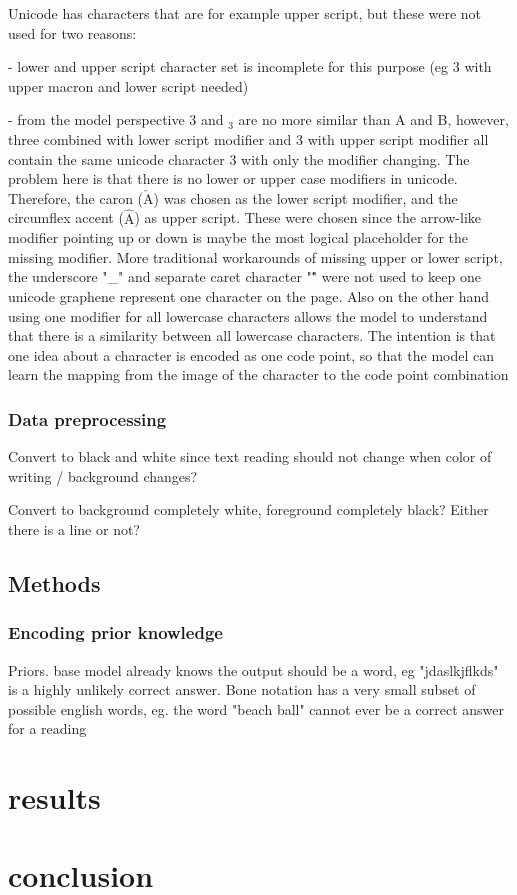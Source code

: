 \documentclass{article}
\begin{document}
Unicode \cite{unicode_homepage} has characters that are for example upper script, but 
these were not used for two reasons:

- lower and upper script character set is incomplete for this purpose (eg 3 with upper macron and lower script needed)

- from the model perspective 3 and $_3$ are no more similar than A and B, however, 
three combined with lower script modifier and 3 with upper script modifier 
all contain the same unicode character 3 with only the modifier changing. The 
problem here is that there is no lower or upper case modifiers in unicode. Therefore,
the caron ($\check{\mathrm{A}}$) was chosen as the lower script modifier, and the circumflex accent ($\hat{\mathrm{A}}$)
as upper script. These were chosen since the arrow-like modifier pointing up or down
is maybe the most logical placeholder for the missing modifier. More traditional 
workarounds of missing upper or lower script, the underscore "\_" and separate 
caret character "\^ " were not used to keep one unicode graphene represent one character 
on the page. Also on the other hand using one modifier for all lowercase characters allows 
the model to understand that there is a similarity between all lowercase characters.
The intention is that one idea about a character is encoded as one code point, so that 
the model can learn the mapping from the image of the character to the code point 
combination

\subsubsection{Data preprocessing}

Convert to black and white since text reading should not change when color of writing / background changes?

Convert to background completely white, foreground completely black? Either there is a line or not?

\subsection{Methods}

\subsubsection{Encoding prior knowledge}
Priors. base model already knows the output should be a word, eg "jdaslkjflkds" is a highly unlikely
correct answer.
Bone notation has a very small subset of possible english words, eg. the word "beach ball" cannot ever be a correct 
answer for a reading

\section{results}

\section{conclusion}

\printbibliography
\end{document}
